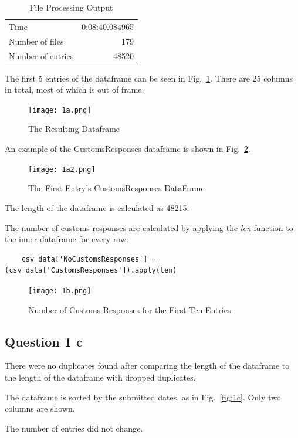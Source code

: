 \documentclass[a4paper,12pt]{article}
\numberwithin{equation}{section}
\numberwithin{figure}{section}
\numberwithin{table}{section}
\begin{document}
\begin{table}[!htb]
    \centering
    \caption{File Processing Output}
    \label{tab:readxml}
    \begin{tabular}{lr}
    \toprule
    Time & 0:08:40.084965 \\
    Number of files & 179\\
    Number of entries & 48520\\\bottomrule
    \end{tabular}
\end{table}

The first 5 entries of the dataframe can be seen in Fig.~\ref{fig:1a}. There are 25 columns in total, most of which is out of frame.

\begin{figure}[!htb]
    \centering
    \texttt{[image: 1a.png]}
    \caption{The Resulting Dataframe}
    \label{fig:1a}
\end{figure}
\FloatBarrier

An example of the CustomsResponses dataframe is shown in Fig.~\ref{fig:1a2}.
\begin{figure}[!htb]
    \centering
    \texttt{[image: 1a2.png]}
    \caption{The First Entry's CustomsResponses DataFrame}
    \label{fig:1a2}
\end{figure}
\FloatBarrier

The length of the dataframe is calculated as 48215. \par 

The number of customs responses are calculated by applying the \emph{len} function to the inner dataframe for every row:
\lstset{language=Python} 
\begin{lstlisting}
    csv_data['NoCustomsResponses'] = (csv_data['CustomsResponses']).apply(len)
\end{lstlisting}

\begin{figure}[!htb]
    \centering
    \texttt{[image: 1b.png]}
    \caption{Number of Customs Responses for the First Ten Entries}
    \label{fig:1b}
\end{figure}
\FloatBarrier

\clearpage
\subsection{Question 1 c}
There were no duplicates found after comparing the length of the dataframe to the length of the dataframe with dropped duplicates. \par 
The dataframe is sorted by the submitted dates. as in Fig.~\ref{fig:1c}. Only two columns are shown. \par 
The number of entries did not change.

\end{document}
